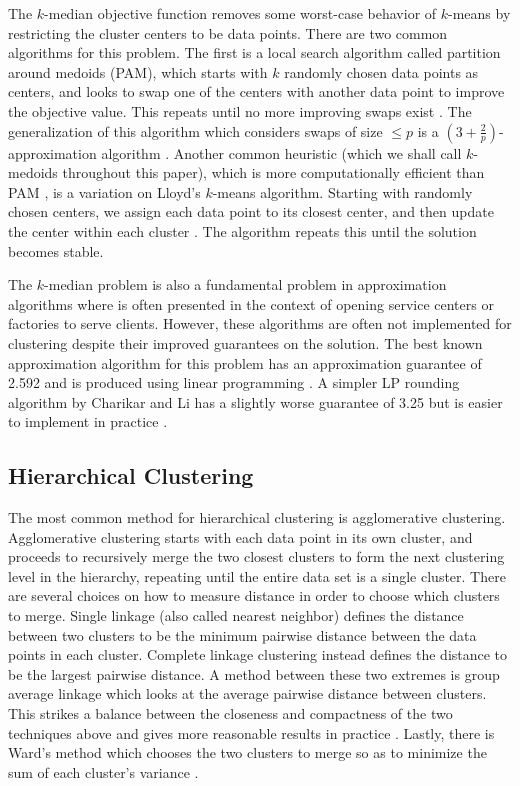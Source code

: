 \documentclass[conference, 10pt, final]{IEEEtran}
\begin{document}
The $k$-median objective function removes some worst-case behavior of $k$-means by restricting the cluster centers to be data points.  There are two common algorithms for this problem. The first is a local search algorithm called partition around medoids (PAM), which starts with $k$ randomly chosen data points as centers, and looks to swap one of the centers with another data point to improve the objective value. This repeats until no more improving swaps exist \cite{ESL}. The generalization of this algorithm which considers swaps of size $\leq p$ is a $(3 + \frac{2}{p})$-approximation algorithm \cite{Arya}.
Another common heuristic (which we shall call $k$-medoids throughout this paper), which is more computationally efficient than PAM \cite{Park}, is a variation on Lloyd's $k$-means algorithm.  Starting with randomly chosen centers, we assign each data point to its closest center, and then update the center within each cluster \cite{Park}. The algorithm repeats this until the solution becomes stable.

The $k$-median problem is also a fundamental problem in approximation algorithms where is often presented in the context of opening service centers or factories to serve clients. However, these algorithms are often not implemented for clustering despite their improved guarantees on the solution. The best known approximation algorithm for this problem has an approximation guarantee of 2.592 and is produced using linear programming \cite{Wu}. A simpler LP rounding algorithm by Charikar and Li has a slightly worse guarantee of 3.25 but is easier to implement in practice \cite{Charikar}. 

\subsection{Hierarchical Clustering}
The most common method for hierarchical clustering is agglomerative clustering. Agglomerative clustering starts with each data point in its own cluster, and proceeds to recursively merge the two closest clusters to form the next clustering level in the hierarchy, repeating until the entire data set is a single cluster.  There are several choices on how to measure distance in order to choose which clusters to merge. Single linkage (also called nearest neighbor) defines the distance between two clusters to be the minimum pairwise distance between the data points in each cluster.  Complete linkage clustering instead defines the distance to be the largest pairwise distance. A method between these two extremes is group average linkage which looks at the average pairwise distance between clusters. This strikes a balance between the closeness and compactness of the two techniques above and gives more reasonable results in practice \cite{ESL}. Lastly, there is Ward's method which chooses the two clusters to merge so as to minimize the sum of each cluster's variance \cite{Ward}.
\end{document}

